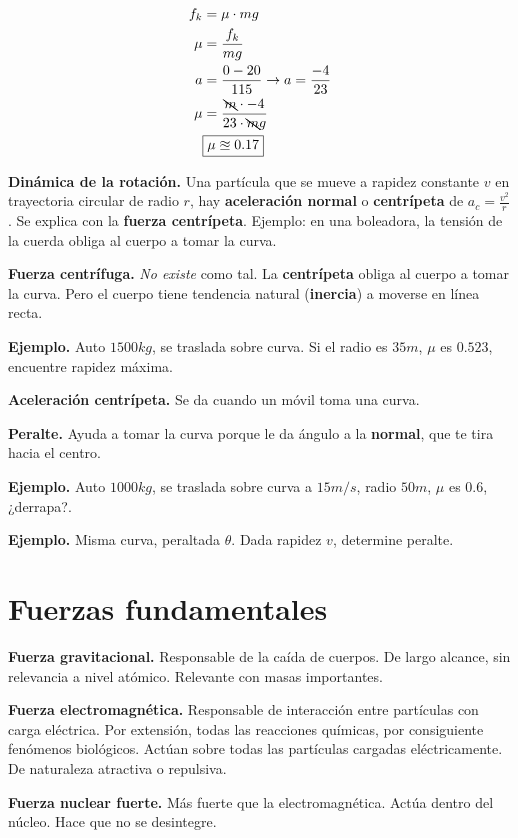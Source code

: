 \documentclass{article}
\begin{document}
\begin{align*}
    f_k & = \mu \cdot mg                                        \\
    \mu & = \frac{f_k}{mg}                                      \\
    a   & = \frac{0 - 20}{115} \rightarrow a = \frac{-4}{23}    \\
    \mu & = \frac{\bcancel{m} \cdot -4}{23 \cdot \bcancel{m} g} \\
    & \boxed{\mu \approxeq 0.17}
\end{align*}

\textbf{Dinámica de la rotación.} Una partícula que se mueve a rapidez constante
\(v\) en trayectoria circular de radio \(r\), hay \textbf{aceleración normal} o
\textbf{centrípeta} de \(a_c = \frac{v^{2}}{r}\). Se explica con la 
\textbf{fuerza centrípeta}. Ejemplo: en una boleadora, la tensión de la cuerda 
obliga al cuerpo a tomar la curva.

\textbf{Fuerza centrífuga.} \textit{No existe} como tal. La \textbf{centrípeta} 
obliga al cuerpo a tomar la curva. Pero el cuerpo tiene tendencia natural 
(\textbf{inercia}) a moverse en línea recta. 

\textbf{Ejemplo.} Auto \(1500 kg\), se traslada sobre curva. Si el radio es 
\(35 m\), \(\mu\) es \(0.523\), encuentre rapidez máxima. 

\textbf{Aceleración centrípeta.} Se da cuando un móvil toma una curva.

\textbf{Peralte.} Ayuda a tomar la curva porque le da ángulo a la 
\textbf{normal}, que te tira hacia el centro.

\textbf{Ejemplo.} Auto \(1000 kg\), se traslada sobre curva a \(15 m/s\), radio 
\(50 m\), \(\mu\) es \(0.6\), ¿derrapa?.

\textbf{Ejemplo.} Misma curva, peraltada \(\theta\). Dada rapidez \(v\), 
determine peralte. 

\section*{Fuerzas fundamentales}

\textbf{Fuerza gravitacional.} Responsable de la caída de cuerpos. De largo 
alcance, sin relevancia a nivel atómico. Relevante con masas importantes.

\textbf{Fuerza electromagnética.} Responsable de interacción entre partículas 
con carga eléctrica. Por extensión, todas las reacciones químicas, por 
consiguiente fenómenos biológicos. Actúan sobre todas las partículas cargadas
eléctricamente. De naturaleza atractiva o repulsiva. 

\textbf{Fuerza nuclear fuerte.} Más fuerte que la electromagnética. Actúa dentro
del núcleo. Hace que no se desintegre. 
\end{document}
